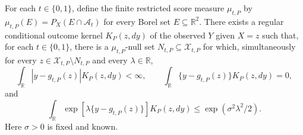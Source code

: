 For each \(t\in\{0,1\}\), define the finite restricted score measure \(\mu_{t,P}\) by \(\mu_{t,P}(E)=P_X(E\cap\mathcal A_t)\) for every Borel set \(E\subseteq\mathbb R^2\). There exists a regular conditional outcome kernel \(K_P(z,dy)\) of the observed \(Y\) given \(X=z\) such that, for each \(t\in\{0,1\}\), there is a \(\mu_{t,P}\)-null set \(N_{t,P}\subseteq\mathcal X_{t,P}\) for which, simultaneously for every \(z\in\mathcal X_{t,P}\setminus N_{t,P}\) and every \(\lambda\in\mathbb R\),
\[
 \int_{\mathbb R}|y-g_{t,P}(z)|K_P(z,dy)<\infty,
 \qquad
 \int_{\mathbb R}\{y-g_{t,P}(z)\}K_P(z,dy)=0,
\]
and
\[
 \int_{\mathbb R}\exp\!\left[\lambda\{y-g_{t,P}(z)\}\right]K_P(z,dy)
 \le \exp(\sigma^2\lambda^2/2).
\]
Here \(\sigma>0\) is fixed and known.